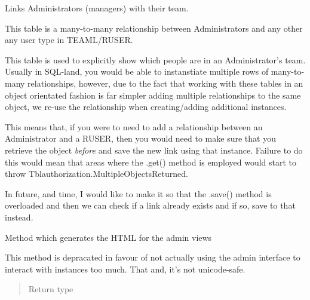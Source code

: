 \documentclass[letterpaper,10pt,english]{sphinxmanual}
\begin{document}
\begin{fulllineitems}
\label{code:timetracker.tracker.models.Tblauthorization}
Links Administrators (managers) with their team.

This table is a many-to-many relationship between Administrators and any
other any user type in TEAML/RUSER.

This table is used to explicitly show which people are in an
Administrator's team. Usually in SQL-land, you would be able to
instanstiate multiple rows of many-to-many relationships, however, due to
the fact that working with these tables in an object orientated fashion is
far simpler adding multiple relationships to the same
{\hyperref[code:timetracker.tracker.models.Tblauthorization]{}} object, we re-use the relationship when
creating/adding additional {\hyperref[code:timetracker.tracker.models.Tblauthorization]{}} instances.

This means that, if you were to need to add a relationship between an
Administrator and a RUSER, then you would need to make sure that you
retrieve the {\hyperref[code:timetracker.tracker.models.Tblauthorization]{}} object \emph{before} and save the new
link using that instance. Failure to do this would mean that areas where
the .get() method is employed would start to throw
Tblauthorization.MultipleObjectsReturned.

In future, and time, I would like to make it so that the .save() method is
overloaded and then we can check if a {\hyperref[code:timetracker.tracker.models.Tblauthorization]{}} link
already exists and if so, save to that instead.

\begin{fulllineitems}
\label{code:timetracker.tracker.models.Tblauthorization.display_users}
Method which generates the HTML for the admin views

This method is depracated in favour of not actually using the admin
interface to interact with {\hyperref[code:timetracker.tracker.models.Tblauthorization]{}} instances too
much. That and, it's not unicode-safe.
\begin{quote}\begin{description}
\item[{Return type}] \leavevmode
{}


\end{description}
\end{quote}
\end{fulllineitems}
\end{fulllineitems}
\end{document}
